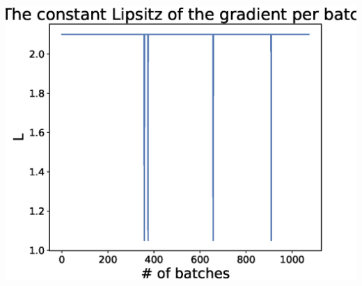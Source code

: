 \documentclass[a0]{a0poster}
\begin{document}
\begin{textblock}{7.0}
\begin{minipage}{0.35\textwidth}
\begin{center}
	\end{center}
\end{minipage}
\begin{minipage}{0.35\textwidth}
	\begin{center}
		\includegraphics[width=1\textwidth]{figures/linreg_L.eps}
	\end{center}
\end{minipage}

\end{textblock}
\end{document}
